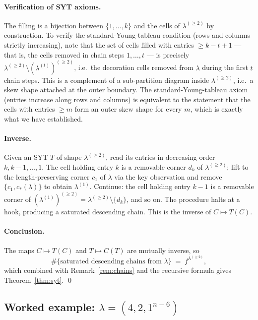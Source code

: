 \documentclass[11pt]{article}
\theoremstyle{definition}
\begin{document}
\paragraph{Verification of SYT axioms.}
The filling is a bijection between $\{1, \ldots, k\}$ and the cells of
$\lambda^{(\ge 2)}$ by construction. To verify the standard-Young-tableau
condition (rows and columns strictly increasing), note that the set of
cells filled with entries $\ge k - t + 1$ — that is, the cells removed
in chain steps $1, \ldots, t$ — is precisely
$\lambda^{(\ge 2)} \setminus (\lambda^{(t)})^{(\ge 2)}$, i.e.\ the
decoration cells removed from $\lambda$ during the first $t$ chain
steps. This is a complement of a sub-partition diagram inside
$\lambda^{(\ge 2)}$, i.e.\ a skew shape attached at the outer boundary.
The standard-Young-tableau axiom (entries increase along rows and
columns) is equivalent to the statement that the cells with entries
$\ge m$ form an outer skew shape for every $m$, which is exactly what we
have established.

\paragraph{Inverse.}
Given an SYT $T$ of shape $\lambda^{(\ge 2)}$, read its entries in
decreasing order $k, k-1, \ldots, 1$. The cell holding entry $k$ is a
removable corner $d_k$ of $\lambda^{(\ge 2)}$; lift to the
length-preserving corner $c_1$ of $\lambda$ via the key observation and
remove $\{c_1, c_*(\lambda)\}$ to obtain $\lambda^{(1)}$. Continue: the
cell holding entry $k - 1$ is a removable corner of
$(\lambda^{(1)})^{(\ge 2)} = \lambda^{(\ge 2)} \setminus \{d_k\}$, and
so on. The procedure halts at a hook, producing a saturated descending
chain. This is the inverse of $C \mapsto T(C)$.

\paragraph{Conclusion.}
The maps $C \mapsto T(C)$ and $T \mapsto C(T)$ are mutually inverse, so
\[
   \#\{\text{saturated descending chains from } \lambda\}
   \;=\; f^{\lambda^{(\ge 2)}},
\]
which combined with Remark~\ref{rem:chains} and the recursive formula
gives Theorem~\ref{thm:syt}. \qed

\subsection{Worked example: $\lambda = (4, 2, 1^{n - 6})$}\label{subsec:syt-example}
\end{document}
